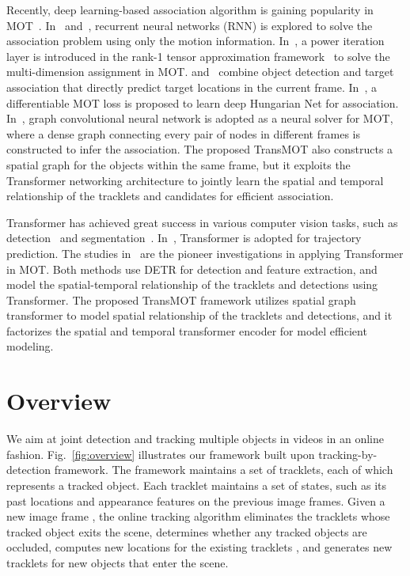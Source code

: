 \documentclass[10pt,twocolumn,letterpaper]{article}
\begin{document}
Recently, deep learning-based association algorithm is gaining popularity in MOT~\cite{zhu2018online}. 
In~\cite{ondruska2016deep} and~\cite{milan2017online}, recurrent neural networks (RNN) is explored to solve the association problem using only the motion information. 
In~\cite{chu2019famnet}, a power iteration layer is introduced in the rank-1 tensor approximation framework~\cite{ShiLXH13cvpr} to solve the multi-dimension assignment in MOT. 
\cite{bergmann2019tracking} and~\cite{zhou2020tracking} combine object detection and target association that directly predict target locations in the current frame.
In~\cite{xu2020train}, a differentiable MOT loss is proposed to learn deep Hungarian Net for association.
In~\cite{braso2020learning}, graph convolutional neural network is adopted as a neural solver for MOT, where a dense graph connecting every pair of nodes in different frames is constructed to infer the association.
The proposed TransMOT also constructs a spatial graph for the objects within the same frame, but it exploits the Transformer networking architecture to jointly learn the spatial and temporal relationship of the tracklets and candidates for efficient association.

Transformer has achieved great success in various computer vision tasks, such as detection~\cite{carion2020end} and segmentation~\cite{liang2020polytransform}. In~\cite{yu2020spatio}, Transformer is adopted for trajectory prediction. The studies in~\cite{sun2020transtrack,meinhardt2021trackformer} are the pioneer investigations in applying Transformer in MOT. Both methods use DETR for detection and feature extraction, and model the spatial-temporal relationship of the tracklets and detections using Transformer. The proposed TransMOT framework {utilizes} spatial graph transformer to model spatial relationship of the tracklets and detections, and it factorizes the spatial and temporal transformer encoder for model efficient modeling.  


\section{Overview}
We aim at joint detection and tracking multiple objects in videos in an online fashion. Fig.~\ref{fig:overview} illustrates our framework built upon tracking-by-detection framework. The framework maintains a set of  tracklets, each of which represents a tracked object. Each tracklet  maintains a set of states, such as its past locations  and appearance features   on the previous  image frames. Given a new image frame , the online tracking algorithm eliminates the tracklets whose tracked object exits the scene, determines whether any tracked objects are occluded, computes new locations for the existing tracklets , and generates new tracklets for new objects that {enter} the scene.
\end{document}

